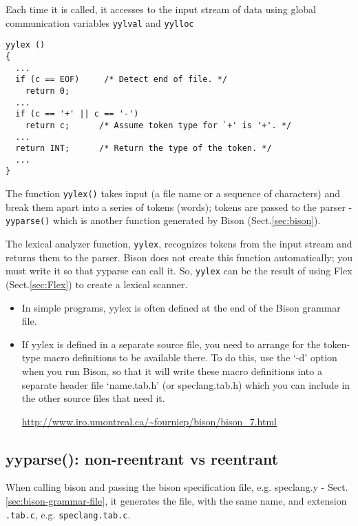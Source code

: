 Each time it is called, it accesses to the input stream of data using
global communication variables \verb!yylval! and \verb!yylloc!
\begin{verbatim}
yylex ()
{
  ...
  if (c == EOF)     /* Detect end of file. */
    return 0;
  ...
  if (c == '+' || c == '-')
    return c;      /* Assume token type for `+' is '+'. */
  ...
  return INT;      /* Return the type of the token. */
  ...
}

\end{verbatim}


The function \verb!yylex()! takes input (a file name or a sequence of
characters) and break them apart into a series of tokens (words); tokens are
passed to the parser - \verb!yyparse()! which is another function generated by
Bison (Sect.\ref{sec:bison}).

\begin{mdframed}
 
The lexical analyzer function, \verb!yylex!, recognizes tokens from the input
stream and returns them to the parser.
Bison does not create this function automatically; you must write it so that
yyparse can call it. So, \verb!yylex! can be the result of using Flex
(Sect.\ref{sec:Flex}) to create a lexical scanner.
\begin{itemize}

  \item  In simple programs, yylex is often defined at the end of the Bison grammar file. 

  \item If yylex is defined in a separate source file, you need to arrange for the
token-type macro definitions to be available there. To do this, use the `-d'
option when you run Bison, so that it will write these macro definitions into a
separate header file `name.tab.h' (or speclang.tab.h) which you can include in
the other source files that need it.

\url{http://www.iro.umontreal.ca/~fourniep/bison/bison_7.html}

\end{itemize}

\end{mdframed}

\subsection{yyparse(): non-reentrant vs reentrant}

When calling bison and passing the bison specification file, e.g. speclang.y -
Sect.\ref{sec:bison-grammar-file}, it generates the file, with the same name,
and extension \verb!.tab.c!, e.g. \verb!speclang.tab.c!.

